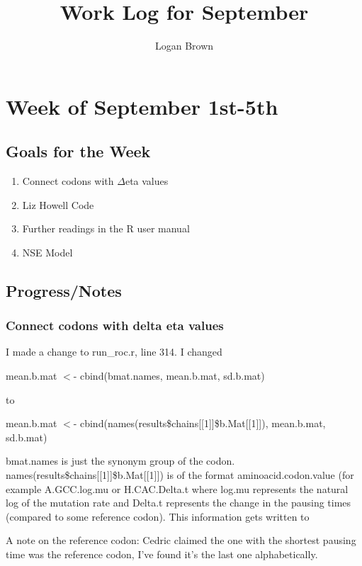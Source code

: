 \documentclass[11pt]{article} %
\title{Work Log for September}
\author{Logan Brown}
\begin{document}
\maketitle


\setcounter{section}{0} %
\setcounter{subsection}{-1}
\setcounter{subsubsection}{0}

\section{Week of September 1st-5th}
\subsection{Goals for the Week}
\begin{enumerate}
\item Connect codons with $\Delta$eta values
\item Liz Howell Code
\item Further readings in the R user manual
\item NSE Model
\end{enumerate}

\subsection{Progress/Notes}

\subsubsection{Connect codons with delta eta values}
I made a change to run\_roc.r, line 314. I changed

\noindent mean.b.mat $<$- cbind(bmat.names, mean.b.mat, sd.b.mat)

	to
	
\noindent mean.b.mat $<$- cbind(names(results\$chains[[1]]\$b.Mat[[1]]), mean.b.mat, sd.b.mat)

bmat.names is just the synonym group of the codon. names(results\$chains[[1]]\$b.Mat[[1]]) is of the format aminoacid.codon.value (for example A.GCC.log.mu or H.CAC.Delta.t where log.mu represents the natural log of the mutation rate and Delta.t represents the change in the pausing times (compared to some reference codon). This information gets written to 

A note on the reference codon: Cedric claimed the one with the shortest pausing time was the reference codon, I've found it's the last one alphabetically.
\end{document}

